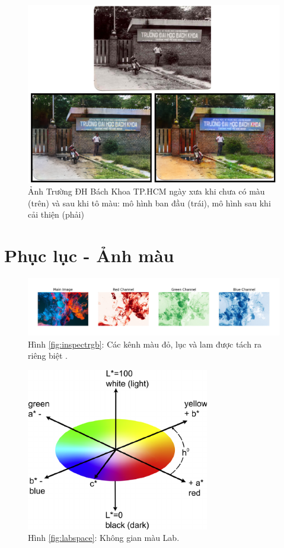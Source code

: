 \documentclass[a4paper, 12pt]{article}
\begin{document}
\begin{figure}[!h]
\captionsetup{width=0.85\textwidth}
\centering
\includegraphics[width=15cm]{images/final.PNG}
\caption{Ảnh Trường ĐH Bách Khoa TP.HCM ngày xưa khi chưa có màu (trên) và sau khi tô màu: mô hình ban đầu (trái), mô hình sau khi cải thiện (phải)}
\label{fig:bkhcmold}
\end{figure}

\section{Phục lục - Ảnh màu}

\begin{figure}[!h]
\captionsetup{width=0.8\textwidth}
\centering
\includegraphics[width=16cm]{images/2_1.jpeg}
\caption*{Hình \ref{fig:inspectrgb}: Các kênh màu đỏ, lục và lam được tách ra riêng biệt \cite{moeincolorization2020}.}
\end{figure}

\begin{figure}[!h]
\captionsetup{width=0.8\textwidth}
\centering
\includegraphics[width=8cm]{images/2_2.png}
\caption*{Hình \ref{fig:labspace}: Không gian màu Lab.}
\end{figure}
\end{document}
